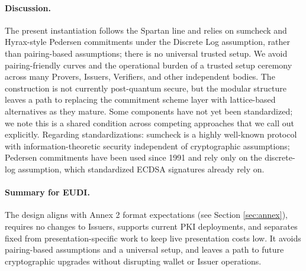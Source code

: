 \paragraph{Discussion.}
The present instantiation follows the Spartan line and relies on sumcheck and Hyrax-style Pedersen commitments under the Discrete Log assumption, rather than pairing-based assumptions; there is no universal trusted setup. 
We avoid pairing-friendly curves and the operational burden of a trusted setup ceremony across many Provers, Issuers, Verifiers, and other independent bodies. 
The construction is not currently post-quantum secure, but the modular structure leaves a path to replacing the commitment scheme layer with lattice-based alternatives as they mature. 
Some components have not yet been standardized; we note this is a shared condition across competing approaches that we call out explicitly.
Regarding standardizations: sumcheck is a highly well-known protocol with information-theoretic security independent of cryptographic assumptions; 
Pedersen commitments have been used since 1991 \cite{C:Pedersen91} and rely only on the discrete-log assumption, which standardized ECDSA signatures already rely on. 

\paragraph{Summary for EUDI.}
The design aligns with Annex 2 format expectations (see Section \ref{sec:annex}), requires no changes to Issuers, supports current PKI deployments, and separates fixed from presentation-specific work to keep live presentation costs low. 
It avoids pairing-based assumptions and a universal setup, and leaves a path to future cryptographic upgrades without disrupting wallet or Issuer operations.


